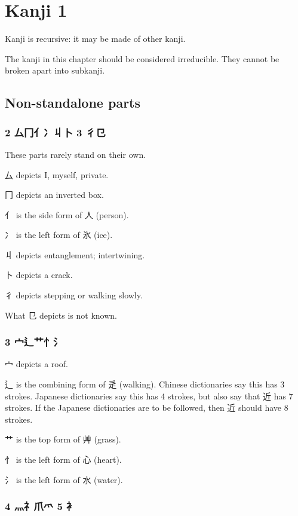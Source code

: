 \chapter{Kanji 1}

Kanji is recursive: it may be made of other kanji.

The kanji in this chapter should be considered irreducible.
They cannot be broken apart into subkanji.

\section{Non-standalone parts}

\subsection{2 厶冂亻冫丩卜 3 彳㔾}

These parts rarely stand on their own.

厶 depicts I, myself, private.

冂 depicts an inverted box.

亻 is the side form of 人 (person).

冫 is the left form of 氷 (ice).

丩 depicts entanglement; intertwining.

卜 depicts a crack.

彳 depicts stepping or walking slowly.

What 㔾 depicts is not known.

\subsection{3 宀辶艹忄氵}

宀 depicts a roof.

辶 is the combining form of 辵 (walking).
Chinese dictionaries say this has 3 strokes.
Japanese dictionaries say this has 4 strokes,
but also say that 近 has 7 strokes.
If the Japanese dictionaries are to be followed,
then 近 should have 8 strokes.

艹 is the top form of 艸 (grass).

忄 is the left form of 心 (heart).

氵 is the left form of 水 (water).

\subsection{4 灬礻爪爫 5 衤}

